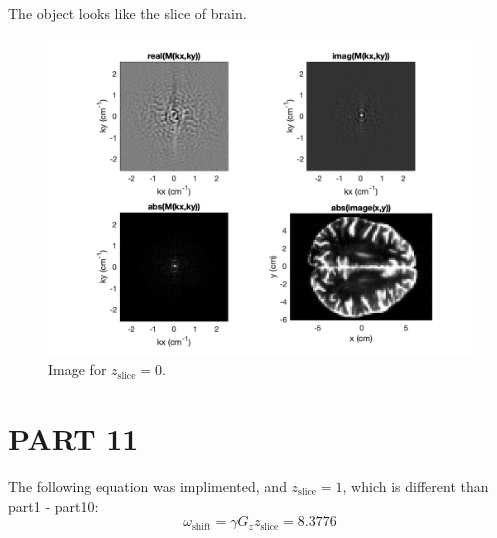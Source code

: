 \documentclass{report}
\begin{document}
The object looks like the slice of brain.
\begin{figure}[hb]
    \centering
    \includegraphics[width=1\textwidth]{11.png}
    \caption{Image for $z_{\text{slice}} = 0$.}
\end{figure}
\newpage 
\section[short]{PART 11}
The following equation was implimented, and $z_{\text{slice}} = 1$, which is different than part1 - part10:
\[
    \omega_{\text{shift}} = \gamma G_z z_{\text{slice}} = 8.3776
\]
\end{document}
